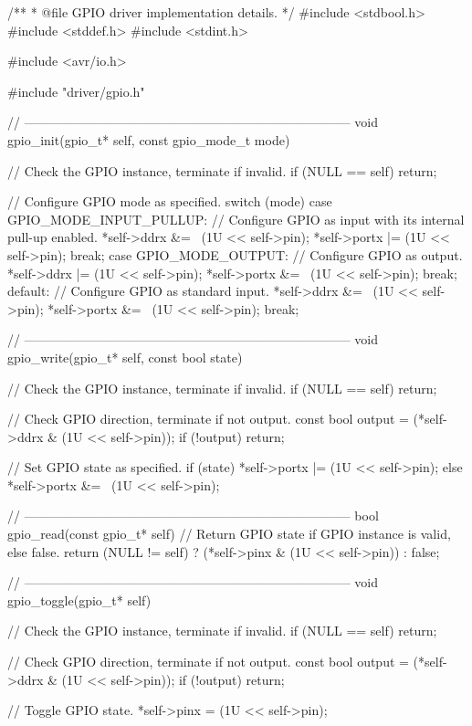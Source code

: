 \begin{ccode}
/**
 * @file GPIO driver implementation details.
 */
#include <stdbool.h>
#include <stddef.h>
#include <stdint.h>

#include <avr/io.h>

#include "driver/gpio.h"

// -----------------------------------------------------------------------------
void gpio_init(gpio_t* self, const gpio_mode_t mode)
{
    // Check the GPIO instance, terminate if invalid.
    if (NULL == self) { return; }

    // Configure GPIO mode as specified.
    switch (mode)
    {
        case GPIO_MODE_INPUT_PULLUP:
            // Configure GPIO as input with its internal pull-up enabled.
            *self->ddrx &= ~(1U << self->pin);
            *self->portx |= (1U << self->pin);
            break;
        case GPIO_MODE_OUTPUT:
            // Configure GPIO as output.
            *self->ddrx |= (1U << self->pin);
            *self->portx &= ~(1U << self->pin);
            break;
        default:
            // Configure GPIO as standard input.
            *self->ddrx &= ~(1U << self->pin);
            *self->portx &= ~(1U << self->pin);
            break;
    }
}

// -----------------------------------------------------------------------------
void gpio_write(gpio_t* self, const bool state)
{
    // Check the GPIO instance, terminate if invalid.
    if (NULL == self) { return; }

    // Check GPIO direction, terminate if not output.
    const bool output = (*self->ddrx & (1U << self->pin));
    if (!output) { return; }

    // Set GPIO state as specified.
    if (state) { *self->portx |= (1U << self->pin); }
    else { *self->portx &= ~(1U << self->pin); }
}

// -----------------------------------------------------------------------------
bool gpio_read(const gpio_t* self)
{
    // Return GPIO state if GPIO instance is valid, else false.
    return (NULL != self) ? (*self->pinx & (1U << self->pin)) : false;
}

// -----------------------------------------------------------------------------
void gpio_toggle(gpio_t* self)
{
    // Check the GPIO instance, terminate if invalid.
    if (NULL == self) { return; }

    // Check GPIO direction, terminate if not output.
    const bool output = (*self->ddrx & (1U << self->pin));
    if (!output) { return; }

    // Toggle GPIO state.
    *self->pinx = (1U << self->pin);
}
\end{ccode}

